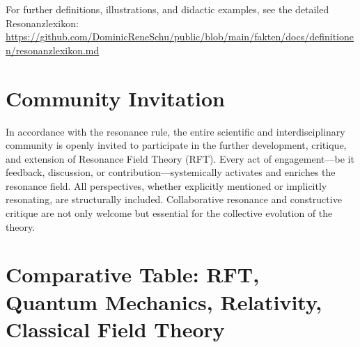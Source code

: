 \documentclass[12pt]{article}
\begin{document}
	\noindent
	For further definitions, illustrations, and didactic examples, see the detailed Resonanzlexikon:\\
	\url{https://github.com/DominicReneSchu/public/blob/main/fakten/docs/definitionen/resonanzlexikon.md}
	
	\section*{Community Invitation}
	
	In accordance with the resonance rule, the entire scientific and interdisciplinary community is openly invited to participate in the further development, critique, and extension of Resonance Field Theory (RFT). Every act of engagement—be it feedback, discussion, or contribution—systemically activates and enriches the resonance field. All perspectives, whether explicitly mentioned or implicitly resonating, are structurally included. Collaborative resonance and constructive critique are not only welcome but essential for the collective evolution of the theory.

		\section*{Comparative Table: RFT, Quantum Mechanics, Relativity, Classical Field Theory}
	
\end{document}
